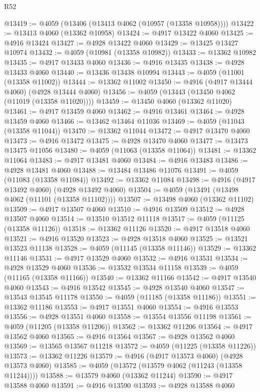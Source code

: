 \begin{lexlean}{R52}
\begin{coremodule}
@13419 := @4059 (@13406 (@13413 @4062 (@10957 (@13358 @10958))))
@13422 := @13413 @4060 (@13362 @10958)
@13424 := @4917 @13422 @4060
@13425 := @4916 @13424
@13427 := @4928 @13422 @4060
@13429 := @13425 @13427 @10974
@13432 := @4059 (@10981 (@13358 @10982))
@13433 := @13362 @10982
@13435 := @4917 @13433 @4060
@13436 := @4916 @13435
@13438 := @4928 @13433 @4060
@13440 := @13436 @13438 @10994
@13443 := @4059 (@11001 (@13358 @11002))
@13444 := @13362 @11002
@13450 := @4916 (@4917 @13444 @4060) (@4928 @13444 @4060)
@13456 := @4059 (@13443 (@13450 @4062 (@11019 (@13358 @11020))))
@13459 := @13450 @4060 (@13362 @11020)
@13461 := @4917 @13459 @4060
@13462 := @4916 @13461
@13464 := @4928 @13459 @4060
@13466 := @13462 @13464 @11036
@13469 := @4059 (@11043 (@13358 @11044))
@13470 := @13362 @11044
@13472 := @4917 @13470 @4060
@13473 := @4916 @13472
@13475 := @4928 @13470 @4060
@13477 := @13473 @13475 @11056
@13480 := @4059 (@11063 (@13358 @11064))
@13481 := @13362 @11064
@13483 := @4917 @13481 @4060
@13484 := @4916 @13483
@13486 := @4928 @13481 @4060
@13488 := @13484 @13486 @11076
@13491 := @4059 (@11083 (@13358 @11084))
@13492 := @13362 @11084
@13498 := @4916 (@4917 @13492 @4060) (@4928 @13492 @4060)
@13504 := @4059 (@13491 (@13498 @4062 (@11101 (@13358 @11102))))
@13507 := @13498 @4060 (@13362 @11102)
@13509 := @4917 @13507 @4060
@13510 := @4916 @13509
@13512 := @4928 @13507 @4060
@13514 := @13510 @13512 @11118
@13517 := @4059 (@11125 (@13358 @11126))
@13518 := @13362 @11126
@13520 := @4917 @13518 @4060
@13521 := @4916 @13520
@13523 := @4928 @13518 @4060
@13525 := @13521 @13523 @11138
@13528 := @4059 (@11145 (@13358 @11146))
@13529 := @13362 @11146
@13531 := @4917 @13529 @4060
@13532 := @4916 @13531
@13534 := @4928 @13529 @4060
@13536 := @13532 @13534 @11158
@13539 := @4059 (@11165 (@13358 @11166))
@13540 := @13362 @11166
@13542 := @4917 @13540 @4060
@13543 := @4916 @13542
@13545 := @4928 @13540 @4060
@13547 := @13543 @13545 @11178
@13550 := @4059 (@11185 (@13358 @11186))
@13551 := @13362 @11186
@13553 := @4917 @13551 @4060
@13554 := @4916 @13553
@13556 := @4928 @13551 @4060
@13558 := @13554 @13556 @11198
@13561 := @4059 (@11205 (@13358 @11206))
@13562 := @13362 @11206
@13564 := @4917 @13562 @4060
@13565 := @4916 @13564
@13567 := @4928 @13562 @4060
@13569 := @13565 @13567 @11218
@13572 := @4059 (@11225 (@13358 @11226))
@13573 := @13362 @11226
@13579 := @4916 (@4917 @13573 @4060) (@4928 @13573 @4060)
@13585 := @4059 (@13572 (@13579 @4062 (@11243 (@13358 @11244))))
@13588 := @13579 @4060 (@13362 @11244)
@13590 := @4917 @13588 @4060
@13591 := @4916 @13590
@13593 := @4928 @13588 @4060

\end{coremodule}
\end{lexlean}
